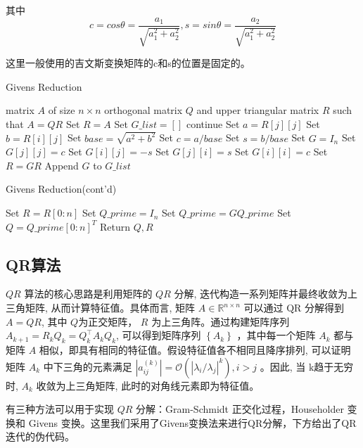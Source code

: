 \documentclass{source/Report}
\begin{document}
其中 $$c=cos\theta=\frac{a_1}{\sqrt{a_1^2+a_2^2}},s=sin\theta=\frac{a_2}{\sqrt{a_1^2+a_2^2}}$$

这里一般使用的吉文斯变换矩阵的c和s的位置是固定的。

\begin{algorithm}
  \caption{Givens Reduction}
  \begin{algorithmic}[1]
    \Require matrix $A$ of size $n \times n$
    \Ensure orthogonal matrix $Q$ and upper triangular matrix $R$ such that $A = QR$
    \State Set $R = A$
    \State Set $G\_list = []$
    \State continue
    \EndIf
    \State Set $a = R[j][j]$
    \State Set $b = R[i][j]$
    \State Set $base = \sqrt{a^2 + b^2}$
    \State Set $c = a / base$
    \State Set $s = b / base$
    \State Set $G = I_n$
    \State Set $G[j][j] = c$
    \State Set $G[i][j] = -s$
    \State Set $G[j][i] = s$
    \State Set $G[i][i] = c$
    \State Set $R = G R$
    \State Append $G$ to $G\_list$
    \EndFor
    \EndFor
  \end{algorithmic}
\end{algorithm}
\begin{algorithm}
  \caption{Givens Reduction(cont'd)}
  \begin{algorithmic}[1]
    \State Set $R = R[0:n]$
    \State Set $Q\_prime = I_n$
    \State Set $Q\_prime = G Q\_prime$
    \EndFor
    \State Set $Q = Q\_prime[0:n]^T$
    \State Return $Q, R$
  \end{algorithmic}
\end{algorithm}

\subsection{QR算法}
$Q R$ 算法的核心思路是利用矩阵的 $Q R$ 分解, 迭代构造一系列矩阵并最终收敛为上三角矩阵, 从而计算特征值。具体而言, 矩阵 $A \in \mathbb{R}^{n \times n}$ 可以通过 $\mathrm{QR}$ 分解得到 $A=Q R$, 其中 $Q$为正交矩阵， $R$ 为上三角阵。通过构建矩阵序列 $A_{k+1}=R_k Q_k=Q_k^{\top} A_k Q_k$, 可以得到矩阵序列 $\left\{A_k\right\}$ ，其中每一个矩阵 $A_k$ 都与矩阵 $A$ 相似，即具有相同的特征值。假设特征值各不相同且降序排列, 可以证明矩阵 $A_k$ 中下三角的元素满足 $\left|a_{i j}^{(k)}\right|=\mathcal{O}\left(\left|\lambda_i / \lambda_j\right|^k\right), i>j$ 。因此, 当 $\mathrm{k}$趋于无穷时, $A_k$ 收敛为上三角矩阵, 此时的对角线元素即为特征值。

有三种方法可以用于实现 $Q R$ 分解：Gram-Schmidt 正交化过程，Householder 变换和 Givens 变换。这里我们采用了Givens变换法来进行QR分解，下方给出了QR迭代的伪代码。
\end{document}
